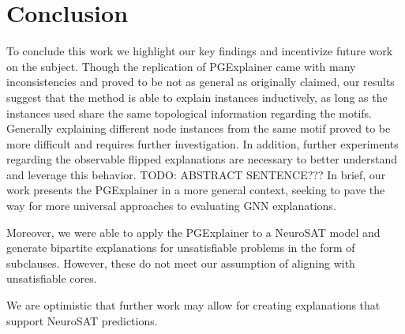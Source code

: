 \chapter{Conclusion}

To conclude this work we highlight our key findings and incentivize future work on the subject.
Though the replication of PGExplainer came with many inconsistencies and proved to be not as general as originally claimed, our results suggest that the method is able to explain instances inductively, as long as the instances used share the same topological information regarding the motifs. Generally explaining different node instances from the same motif proved to be more difficult and requires further investigation. In addition, further experiments regarding the observable flipped explanations are necessary to better understand and leverage this behavior. 
TODO: ABSTRACT SENTENCE???
In brief, our work presents the PGExplainer in a more general context, seeking to pave the way for more universal approaches to evaluating GNN explanations.

Moreover, we were able to apply the PGExplainer to a NeuroSAT model and generate bipartite explanations for unsatisfiable problems in the form of subclauses. However, these do not meet our assumption of aligning with unsatisfiable cores. 

We are optimistic that further work may allow for creating explanations that support NeuroSAT predictions.